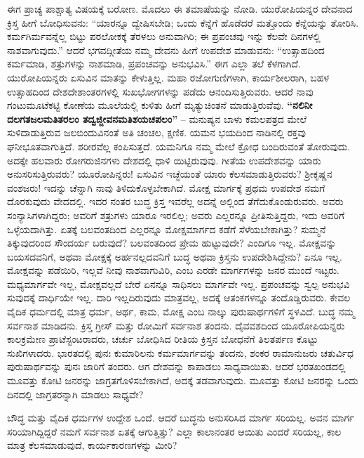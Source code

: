 ಈಗ ಪ್ರಾಚ್ಯ ಪಾಶ್ಚಾತ್ಯ ವಿಷಯಕ್ಕೆ ಬರೋಣ. ಮೊದಲು ಈ ತಮಾಷೆಯನ್ನು ನೋಡಿ. ಯುರೋಪಿಯನ್ನರ ದೇವನಾದ ಕ್ರಿಸ್ತ ಹೀಗೆ ಬೋಧಿಸುವನು: “ಯಾರನ್ನೂ ದ್ವೇಷಿಸಬೇಡಿ; ಒಂದು ಕೆನ್ನೆಗೆ ಹೊಡೆದರೆ ಮತ್ತೊಂದು ಕೆನ್ನೆಯನ್ನು ತೋರಿಸಿ. ಕರ್ಮ\-ಗಿರ್ಮವನ್ನೆಲ್ಲ ಬಿಟ್ಟು ಪರಲೋಕಕ್ಕೆ ತೆರಳಲು ಅನುವಾಗಿರಿ; ಈ ಪ್ರಪಂಚವು ಇನ್ನು ಕೆಲವೇ ದಿನಗಳಲ್ಲಿ ನಾಶವಾಗುವುದು.” ಆದರೆ ಭಗವದ್ಗೀತೆಯ ನಮ್ಮ ದೇವನು ಹೀಗೆ ಉಪದೇಶ ಮಾಡುವನು: “ಉತ್ಸಾಹದಿಂದ ಕರ್ಮಮಾಡಿ, ಶತ್ರುಗಳನ್ನು ನಾಶಮಾಡಿ, ಪ್ರಪಂಚವನ್ನು ಅನುಭವಿಸಿ.” ಈಗ ಎಲ್ಲಾ ತಲೆ ಕೆಳಗಾಗಿದೆ. ಯುರೋಪಿಯನ್ನರು ಏಸುವಿನ ಮಾತನ್ನು ಕೇಳುತ್ತಿಲ್ಲ. ಮಹಾ ರಜೋಗುಣಿಗಳಾಗಿ, ಕಾರ್ಯಶೀಲರಾಗಿ, ಬಹಳ ಉತ್ಸಾಹದಿಂದ ದೇಶದೇಶಾಂತರಗಳಲ್ಲಿ ಸುಖಭೋಗಗಳನ್ನು ಪಡೆದು ಆನಂದಿಸುತ್ತಿರುವರು. ಆದರೆ ನಾವು ಗಂಟುಮೂಟೆಕಟ್ಟಿ ಕೋಣೆಯ ಮೂಲೆಯಲ್ಲಿ ಕುಳಿತು ಹೀಗೆ ಮೃತ್ಯುಚಿಂತನೆ ಮಾಡುತ್ತಿರುವೆವು. \textbf{“ನಲಿನೀ ದಲಗತಜಲಮತಿತರಲಂ ತದ್ವಜ್ಜೀವನಮತಿಶಯಚಪಲಂ”} – ಮನುಷ್ಯನ ಬಾಳು ಕಮಲಪತ್ರದ ಮೇಲೆ ಸುಳಿದಾಡುತ್ತಿರುವ ಜಲಬಿಂದುವಿನಂತೆ ಅತಿ ಚಂಚಲ, ಕ್ಷಣಿಕ. ಯಮನ ಭಯದಿಂದ ನಾಡಿನಲ್ಲಿ ರಕ್ತವು ಘನೀಭೂತವಾಗುತ್ತಿದೆ. ಶರೀರವೆಲ್ಲ ಕಂಪಿಸುತ್ತದೆ. ಯಮನಿಗೂ ನಮ್ಮ ಮೇಲೆ ಕ್ರೋಧ ಬಂದಿರುವಂತೆ ತೋರುವುದು. ಅದಕ್ಕೇ ಹಲವಾರು ರೋಗರುಜಿನಗಳು ದೇಶದಲ್ಲಿ ಧಾಳಿ ಯಿಟ್ಟಿರುವುವು. ಗೀತೆಯ ಉಪದೇಶವನ್ನು ಯಾರು ಅನುಸರಿಸುತ್ತಿರುವರು? ಯೂರೋಪಿನ್ನರು! ಏಸುವಿನ ಇಚ್ಛೆಯಂತೆ ಯಾರು ಕೆಲಸಮಾಡುತ್ತಿರುವರು? ಶ‍್ರೀಕೃಷ್ಣನ ವಂಶಜರು! ಇದನ್ನು ಚೆನ್ನಾಗಿ ನಾವು ತಿಳಿದುಕೊಳ್ಳಬೇಕಾಗಿದೆ. ಮೋಕ್ಷ ಮಾರ್ಗಕ್ಕೆ ಪ್ರಥಮ ಉಪದೇಶ ನಮಗೆ ದೊರಕುವುದು ವೇದದಲ್ಲಿ. ಇದರ ನಂತರ ಬುದ್ಧ ಕ್ರಿಸ್ತ ಇವರೆಲ್ಲ ಅದನ್ನೆ ಅಲ್ಲಿಂದ ತೆಗೆದುಕೊಂಡುರುವರು. ಅವರು ಸಂನ್ಯಾಸಿಗಳಾಗಿದ್ದರು; ಅವರಿಗೆ ಶತ್ರುಗಳು ಯಾರೂ ಇರಲಿಲ್ಲ; ಅವರು ಎಲ್ಲರನ್ನೂ ಪ್ರೀತಿಸುತ್ತಿದ್ದರು, ಇದು ಅವರಿಗೆ ಒಳ್ಳೆಯದಾಗಿತ್ತು. ಏತಕ್ಕೆ ಬಲವಂತದಿಂದ ಎಲ್ಲರನ್ನೂ ಮೋಕ್ಷಮಾರ್ಗದ ಕಡೆಗೆ ಸೆಳೆಯಬೇಕಾಗಿತ್ತು? ಸುಮ್ಮನೆ ತಿಕ್ಕುವುದರಿಂದ ಸೌಂದರ್ಯ ಬರುವುದೆ? ಬಲವಂತದಿಂದ ಪ್ರೇಮ ಹುಟ್ಟುವುದೇ? ಎಂದಿಗೂ ಇಲ್ಲ. ಮೋಕ್ಷವನ್ನು ಬಯಸದವನಿಗೆ, ಅಥವಾ ಮೋಕ್ಷಕ್ಕೆ ಅರ್ಹನಲ್ಲದವನಿಗೆ ಬುದ್ಧ ಅಥವಾ ಕ್ರಿಸ್ತನು ಉಪದೇಶಿಸಿದ್ದೇನು? ಏನೂ ಇಲ್ಲ. ಮೋಕ್ಷವನ್ನು ಪಡೆಯಿರಿ, ಇಲ್ಲವೆ ನೀವು ನಾಶವಾಗುವಿರಿ, ಎಂಬ ಎರಡೇ ಮಾರ್ಗಗಳನ್ನು ಜನರ ಮುಂದೆ ಇಟ್ಟರು. ಮಧ್ಯಮಾರ್ಗವೇ ಇಲ್ಲ, ಮೋಕ್ಷವಲ್ಲದೆ ಬೇರೆ ಏನನ್ನೂ ಸಾಧಿಸಲು ಮಾರ್ಗವೇ ಇಲ್ಲ. ಪ್ರಪಂಚವನ್ನು ಸ್ವಲ್ಪ ಅನುಭವಿ ಸುವುದಕ್ಕೆ ದಾರ್ಧಿಯೇ ಇಲ್ಲ. ದಾರಿ ಇಲ್ಲದಿರುವುದು ಮಾತ್ರವಲ್ಲ, ಅದಕ್ಕೆ ಆತಂಕಗಳನ್ನೂ ತಂದೊಡ್ಡಿರುವರು. ಕೇವಲ ವೈದಿಕ ಧರ್ಮದಲ್ಲಿ ಮಾತ್ರ ಧರ್ಮ, ಅರ್ಥ, ಕಾಮ, ಮೋಕ್ಷ ಎಂಬ ನಾಲ್ಕು ಪುರುಷಾರ್ಥಗಳಿಗೆ ಸ್ಥಳವಿದೆ. ಬುದ್ಧ ನಮ್ಮ ಸರ್ವನಾಶ ಮಾಡಿದನು. ಕ್ರಿಸ್ತ ಗ್ರೀಸ್​ ಮತ್ತು ರೋಮಿಗೆ ಸರ್ವನಾಶ ತಂದನು. ದೈವವಶದಿಂದ ಯೂರೋಪಿಯನ್ನರು ಕಾಲಕ್ರಮೇಣ ಪ್ರಾಟೆಸ್ಟಂಟರಾದರು, ಚರ್ಚು ಬೋಧಿಸಿದ ರೀತಿಯ ಕ್ರಿಸ್ತನ ಬೋಧನೆಗೆ ತಿಲತರ್ಪಣ ಕೊಟ್ಟು ಸುಖಿಗಳಾದರು. ಭಾರತದಲ್ಲಿ ಪುನಃ ಕುಮಾರಿಲನು ಕರ್ಮಮಾರ್ಗವನ್ನು ತಂದನು, ಶಂಕರ ರಾಮಾನುಜರು ಚತುರ್ವಿಧ ಪುರುಷಾರ್ಥವನ್ನು ಪುನಃ ಜಾರಿಗೆ ತಂದರು. ಆಗ ದೇಶವನ್ನು ಕಾಪಾಡಲು ಸಾಧ್ಯವಾಯಿತು. ಆದರೆ ಭರತಖಂಡದಲ್ಲಿ ಮೂವತ್ತು ಕೋಟಿ ಜನರನ್ನು ಜಾಗ್ರತಗೊಳಿಸಬೇಕಾಗಿದೆ, ಅದಕ್ಕೆ ತಡವಾಗುವುದು. ಮೂವತ್ತು ಕೋಟಿ ಜನರನ್ನು ಒಂದು ದಿನದಲ್ಲಿ ಜಾಗ್ರತರನ್ನಾಗಿ ಮಾಡಲು ಸಾಧ್ಯವೇ?

ಬೌದ್ಧ ಮತ್ತು ವೈದಿಕ ಧರ್ಮಗಳ ಉದ್ದೇಶ ಒಂದೆ. ಆದರೆ ಬುದ್ಧನು ಅನುಸರಿಸಿದ ಮಾರ್ಗ ಸರಿಯಲ್ಲ. ಅವನ ಮಾರ್ಗ ಸರಿಯಾಗಿದ್ದಿದ್ದರೆ ನಮಗೆ ಸರ್ವನಾಶ ಏತಕ್ಕೆ ಆಗುತ್ತಿತ್ತು? ಎಲ್ಲಾ ಕಾಲಾನಂತರ ಆಯಿತು ಎಂದರೆ ಸರಿಯಲ್ಲ, ಕಾಲ ಮಾತ್ರ ಕೆಲಸಮಾಡುವುದೆ, ಕಾರ್ಯಕಾರಣಗಳನ್ನು ಮೀರಿ?

